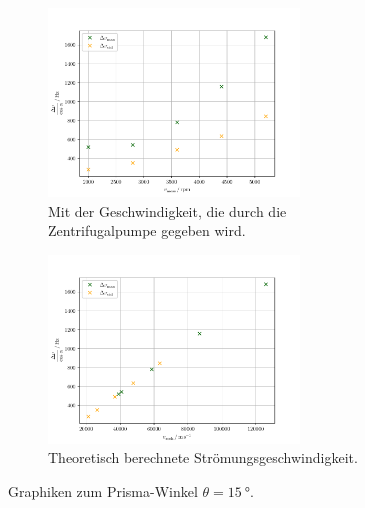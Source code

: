 \begin{figure}
    \centering
    \begin{subfigure}{0.48\textwidth}
        \centering
        \includegraphics[height=5.0cm]{plots/15_2.pdf}
        \caption{Mit der Geschwindigkeit, die durch die Zentrifugalpumpe gegeben wird.}
        \label{fig:exp15}
    \end{subfigure}
    \begin{subfigure}{0.48\textwidth}
        \centering
        \includegraphics[height=5.0cm]{plots/15_1.pdf}
        \caption{Theoretisch berechnete Strömungsgeschwindigkeit.}
        \label{fig:theo15}
    \end{subfigure}
    \caption{Graphiken zum Prisma-Winkel $\theta=\SI{15}{\degree}$.}
    \label{fig:15}
\end{figure}
